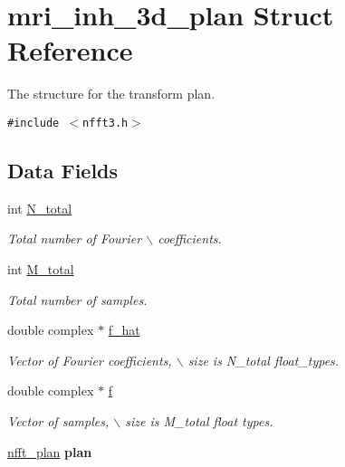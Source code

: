 \hypertarget{structmri__inh__3d__plan}{
\section{mri\_\-inh\_\-3d\_\-plan Struct Reference}
\label{structmri__inh__3d__plan}
}
The structure for the transform plan.  


{\tt \#include $<$nfft3.h$>$}

\subsection*{Data Fields}
\begin{CompactItemize}
\item 
\hypertarget{structmri__inh__3d__plan_o0}{
int \hyperlink{structmri__inh__3d__plan_o0}{N\_\-total}}
\label{structmri__inh__3d__plan_o0}

\begin{CompactList}\small\item\em Total number of Fourier $\backslash$ coefficients. \item\end{CompactList}\item 
\hypertarget{structmri__inh__3d__plan_o1}{
int \hyperlink{structmri__inh__3d__plan_o1}{M\_\-total}}
\label{structmri__inh__3d__plan_o1}

\begin{CompactList}\small\item\em Total number of samples. \item\end{CompactList}\item 
\hypertarget{structmri__inh__3d__plan_o2}{
double complex $\ast$ \hyperlink{structmri__inh__3d__plan_o2}{f\_\-hat}}
\label{structmri__inh__3d__plan_o2}

\begin{CompactList}\small\item\em Vector of Fourier coefficients, $\backslash$ size is N\_\-total float\_\-types. \item\end{CompactList}\item 
\hypertarget{structmri__inh__3d__plan_o3}{
double complex $\ast$ \hyperlink{structmri__inh__3d__plan_o3}{f}}
\label{structmri__inh__3d__plan_o3}

\begin{CompactList}\small\item\em Vector of samples, $\backslash$ size is M\_\-total float types. \item\end{CompactList}\item 
\hypertarget{structmri__inh__3d__plan_o4}{
\hyperlink{structnfft__plan}{nfft\_\-plan} {\bf plan}}
\label{structmri__inh__3d__plan_o4}


\end{CompactItemize}
